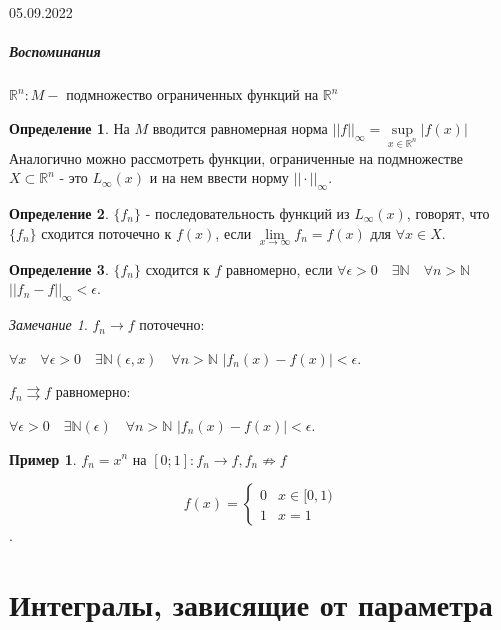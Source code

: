 \documentclass[a4paper, 12pt]{article}
\theoremstyle{definition}
\newtheorem*{example}{Пример}
\newtheorem*{definition}{Определение}
\theoremstyle{remark}
\newtheorem*{remark}{Замечание}
\begin{document}
05.09.2022
\subparagraph*{Воспоминания}	

$\mathbb{R}^n: M - $ подмножество ограниченных функций на $\mathbb{R}^n$

\begin{definition}
     На $M$ вводится равномерная норма $||f||_{\infty} = \sup\limits_{x\in \mathbb{R}^n}|f(x)|$
Аналогично можно рассмотреть функции, ограниченные на подмножестве $X\subset \mathbb{R}^n$ - это
$L_{\infty}(x)$ и на нем ввести норму $||\cdot||_{\infty}$.
\end{definition}

\begin{definition}
     $\{f_n\}$ - последовательность функций из $L_{\infty}(x)$, говорят, что $\{f_n\}$ сходится поточечно к $f(x)$, если
$\lim\limits_{x \to \infty}f_n = f(x)$ для $\forall x \in X$.
\end{definition}
\begin{definition}
     $\{f_n\}$ сходится к $f$ равномерно, если $\forall \epsilon>0 \quad \exists\mathbb{N} \quad \forall n > \mathbb{N}$
$||f_n-f||_{\infty} < \epsilon$.
\end{definition}
\begin{remark}
     $f_n \to f$ поточечно: 

$\forall x \quad \forall \epsilon>0 \quad \exists\mathbb{N}(\epsilon, x) \quad \forall n > \mathbb{N}$
$|f_n(x)-f(x)| < \epsilon$.

$f_n \rightrightarrows f$ равномерно:

$\forall \epsilon>0 \quad \exists\mathbb{N}(\epsilon) \quad \forall n > \mathbb{N}$
$|f_n(x)-f(x)| < \epsilon$.
\end{remark} 

\begin{example}
     $f_n = x^n$ на $[0;1]: f_n \to f, f_n 	\nRightarrow f$ 

\begin{equation*}
     f(x) = 
      \begin{cases}
        0 &\text{$x\in [0, 1)$}\\
        1 &\text{$x = 1$}
      \end{cases}
     \end{equation*}.

\end{example}

\section{Интегралы, зависящие от параметра}
\end{document}
